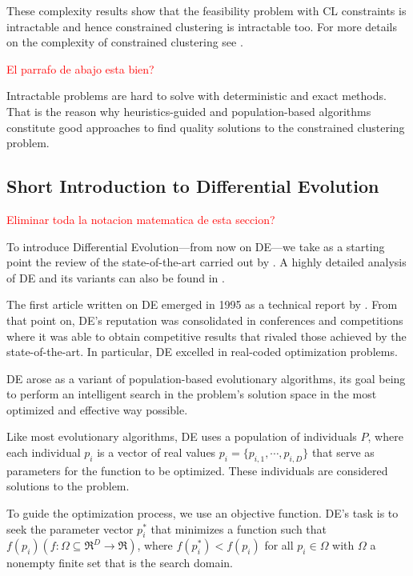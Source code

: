 \documentclass[review]{elsarticle}
\begin{document}
These complexity results show that the feasibility problem with CL constraints is intractable and hence constrained clustering is intractable too. For more details on the complexity of constrained clustering see \cite{davidson2005clustering}.

\textcolor{red}{El parrafo de abajo esta bien?}

Intractable problems are hard to solve with deterministic and exact methods. That is the reason why heuristics-guided and population-based algorithms constitute good approaches to find quality solutions to the constrained clustering problem.

\subsection{Short Introduction to Differential Evolution}

\textcolor{red}{Eliminar toda la notacion matematica de esta seccion?}

To introduce Differential Evolution---from now on DE---we take as a starting point the review of the state-of-the-art carried out by \cite{das2011differential}. A highly detailed analysis of DE and its variants can also be found in \cite{das2011differential}.

The first article written on DE emerged in 1995 as a technical report by \cite{noman2008differential}. From that point on, DE's reputation was consolidated in conferences and competitions where it was able to obtain competitive results that rivaled those achieved by the state-of-the-art. In particular, DE excelled in real-coded optimization problems.

DE arose as a variant of population-based evolutionary algorithms, its goal being to perform an intelligent search in the problem's solution space in the most optimized and effective way possible.

Like most evolutionary algorithms, DE uses a population of individuals $P$, where each individual $p_i$ is a vector of real values $p_i = \{p_{i,1},\cdots,p_{i,D}\}$ that serve as parameters for the function to be optimized. These individuals are considered solutions to the problem.

To guide the optimization process, we use an objective function. DE's task is to seek the parameter vector $p_i^*$ that minimizes a function such that $f(p_i)(f: \Omega \subseteq \mathfrak{R}^D \rightarrow \mathfrak{R})$, where $f(p_i^*) < f(p_i)$ for all $p_i \in \Omega$ with $\Omega$ a nonempty finite set that is the search domain.
\end{document}
